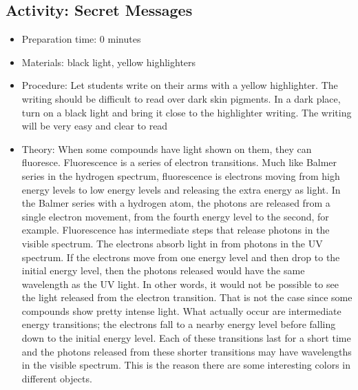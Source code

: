 \subsection{Activity: Secret Messages}
\begin{itemize}
\item{Preparation time: 0 minutes}
\item{Materials: black light, yellow highlighters}
\item{Procedure: Let students write on their arms with a yellow highlighter. The writing should be difficult to read over dark skin pigments. In a dark place, turn on a black light and bring it close to the highlighter writing. The writing will be very easy and clear to read}
\item{Theory: When some compounds have light shown on them, they can fluoresce. Fluorescence is a series of electron transitions. Much like Balmer series in the hydrogen spectrum, fluorescence is electrons moving from high energy levels to low energy levels and releasing the extra energy as light. In the Balmer series with a hydrogen atom, the photons are released from a single electron movement, from the fourth energy level to the second, for example. Fluorescence has intermediate steps that release photons in the visible spectrum. The electrons absorb light in from photons in the UV spectrum. If the electrons move from one energy level and then drop to the initial energy level, then the photons released would have the same wavelength as the UV light. In other words, it would not be possible to see the light released from the electron transition. That is not the case since some compounds show pretty intense light. What actually occur are intermediate energy transitions; the electrons fall to a nearby energy level before falling down to the initial energy level. Each of these transitions last for a short time and the photons released from these shorter transitions may have wavelengths in the visible spectrum. This is the reason there are some interesting colors in different objects.}
\end{itemize}


